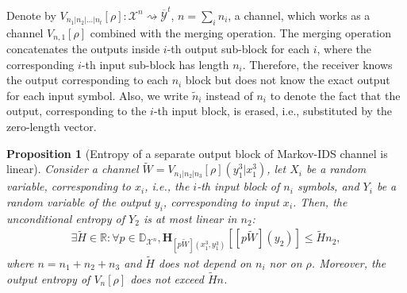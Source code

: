 \documentclass[journal, twocol]{IEEEtran}
\newcommand{\tn}{{\widetilde{n}}}
\newcommand{\bD}{{\mathbb{D}}}
\newcommand{\bfH}{{\mathbf{H}}}
\newcommand{\tH}{{\widetilde{H}}}
\newcommand{\bR}{{\mathbb{R}}}
\newcommand{\tW}{{\widetilde{W}}}
\newcommand{\mX}{{\mathcal{X}}}
\newcommand{\omY}{{\overline{\mathcal{Y}}}}
\newcommand{\brsq}[1]{{\left[{#1}\right]}}
\newcommand{\tosq}{\rightsquigarrow}
\newtheorem{proposition}{Proposition}
\newcommand{\pW}[2]{[{#1}{#2}]}
\begin{document}
Denote by $V_{n_1|n_2|...|n_t}[\rho]:\mX^n\tosq \omY^t$, $n=\sum_i n_i$, a channel, which works as a channel $V_{n,1}[\rho]$ combined with the merging operation.
The merging operation concatenates the outputs inside $i$-th output sub-block for each $i$, where the corresponding $i$-th input sub-block has length $n_i$.
Therefore, the receiver knows the output corresponding to each $n_i$ block but does not know the exact output for each input symbol.
Also, we write $\tn_i$ instead of $n_i$ to denote the fact that the output, corresponding to the $i$-th input block, is erased, i.e., substituted by the zero-length vector.

\begin{proposition}[Entropy of a separate output block of Markov-IDS channel is linear]
\label{p:linH}
Consider a channel $\tW=V_{n_1|n_2|n_3}[\rho](y_1^3|x_1^3)$, let $X_i$ be a random variable, corresponding to $x_i$, i.e., the $i$-th input block of $n_i$ symbols, and $Y_i$ be a random variable of the output $y_i$, corresponding to input $x_i$. 
Then, the unconditional entropy of $Y_2$ is at most linear in $n_2$:
\begin{align}
\exists \tH\in\bR: \forall p\in\bD_{\mX^{n}}, \bfH_{\pW{p}{\tW}(x_1^3,y_1^3)}\brsq{\pW{p}{\tW}(y_2)} \leq \tH n_2,
\label{eq:finHmarkov}
\end{align}
where $n=n_1+n_2+n_3$ and $\tH$ does not depend on $n_i$ nor on $\rho$.
Moreover, the output entropy of $V_n[\rho]$ does not exceed $\tH n$.
\end{proposition}
\end{document}
